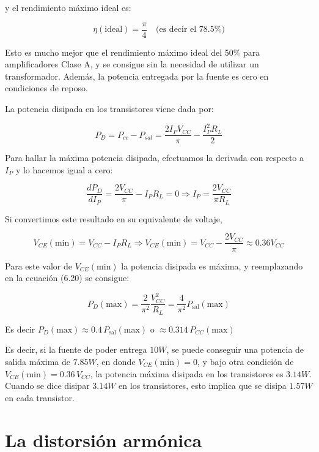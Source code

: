 y el rendimiento máximo ideal es:

\begin{equation}
	\eta (\text{ideal}) = \frac{\pi}{4} \quad \text{(es decir el 78.5\%)}
\end{equation}

Esto es mucho mejor que el rendimiento máximo ideal del 50\% para amplificadores Clase A, y se consigue sin la necesidad de utilizar un transformador. Además, la potencia entregada por la fuente es cero en condiciones de reposo.

La potencia disipada en los transistores viene dada por:

\begin{equation}
	P_D = P_{cc} - P_{sal} = \frac{2 I_P V_{CC}}{\pi} - \frac{I_P^2 R_L}{2}
\end{equation}

Para hallar la máxima potencia disipada, efectuamos la derivada con respecto a $I_P$ y lo hacemos igual a cero:

\[
\frac{d P_D}{d I_P} = \frac{2 V_{CC}}{\pi} - I_P R_L = 0 \Rightarrow I_P = \frac{2 V_{CC}}{\pi R_L}
\]

Si convertimos este resultado en su equivalente de voltaje,

\[
V_{CE}(\text{min}) = V_{CC} - I_P R_L \Rightarrow V_{CE}(\text{min}) = V_{CC} - \frac{2 V_{CC}}{\pi} \approx 0.36 V_{CC}
\]

Para este valor de $V_{CE}(\text{min})$ la potencia disipada es máxima, y reemplazando en la ecuación (6.20) se consigue:

\begin{equation} \label{eq:potencia_p-disipada-maxima}
	P_D(\text{max}) = \frac{2}{\pi^2} \frac{V_{CC}^2}{R_L} = \frac{4}{\pi^2} P_{\text{sal}}(\text{max})
\end{equation}

Es decir $P_D(\text{max}) \approx 0.4\, P_{\text{sal}}(\text{max})$ o $\approx 0.314\, P_{CC}(\text{max})$

Es decir, si la fuente de poder entrega $10W$, se puede conseguir una potencia de salida máxima de $7.85W$, en donde $V_{CE}(\text{min}) = 0$, y bajo otra condición de $V_{CE}(\text{min}) = 0.36\,V_{CC}$, la potencia máxima disipada en los transistores es $3.14W$. Cuando se dice disipar $3.14W$ en los transistores, esto implica que se disipa $1.57W$ en cada transistor.

\section{La distorsión armónica} %

